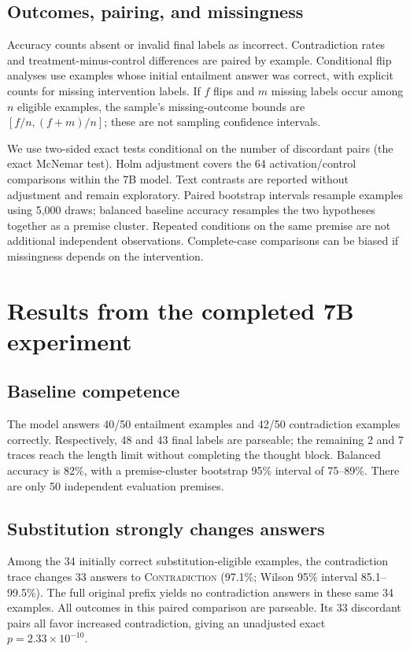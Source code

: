 \documentclass[10pt]{article}
\newcommand{\con}{\textsc{Contradiction}}
\begin{document}
\subsection{Outcomes, pairing, and missingness}
Accuracy counts absent or invalid final labels as incorrect. Contradiction rates
and treatment-minus-control differences are paired by example. Conditional flip
analyses use examples whose initial entailment answer was correct, with explicit
counts for missing intervention labels. If $f$ flips and $m$ missing labels occur
among $n$ eligible examples, the sample's missing-outcome bounds are
$[f/n,(f+m)/n]$; these are not sampling confidence intervals.

We use two-sided exact tests conditional on the number of discordant pairs
(the exact McNemar test). Holm adjustment covers the 64 activation/control
comparisons within the 7B model. Text contrasts are reported without adjustment
and remain exploratory. Paired bootstrap intervals resample examples using
5,000 draws; balanced baseline accuracy resamples the two hypotheses together
as a premise cluster. Repeated conditions on the same premise are not additional
independent observations. Complete-case comparisons can be biased if missingness
depends on the intervention.

\section{Results from the completed 7B experiment}
\subsection{Baseline competence}
The model answers 40/50 entailment examples and 42/50 contradiction examples
correctly. Respectively, 48 and 43 final labels are parseable; the remaining
2 and 7 traces reach the length limit without completing the thought block.
Balanced accuracy is 82\%, with a premise-cluster bootstrap 95\% interval
of 75--89\%. There are only 50 independent evaluation premises.

\subsection{Substitution strongly changes answers}
Among the 34 initially correct substitution-eligible examples, the contradiction
trace changes 33 answers to \con{} (97.1\%; Wilson 95\% interval 85.1--99.5\%).
The full original prefix yields no contradiction answers in these same 34
examples. All outcomes in this paired comparison are parseable. Its 33 discordant
pairs all favor increased contradiction, giving an unadjusted exact
$p=2.33\times10^{-10}$.
\end{document}
